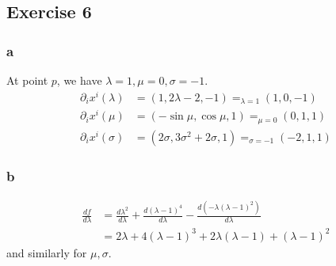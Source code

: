 \subsection{Exercise 6}
\subsubsection{a}
At point $p$, we have $\lambda=1, \mu=0,\sigma=-1$.
\begin{align}
    \partial_i x^i(\lambda) &= (1, 2\lambda-2,-1) =_{\lambda=1} (1,0,-1) \\
    \partial_i x^i(\mu) &= (-\sin{\mu},\cos{\mu}, 1) =_{\mu=0} (0,1,1) \\
    \partial_i x^i(\sigma) &= (2\sigma, 3\sigma^2+2\sigma, 1) =_{\sigma=-1} (-2,1,1)
\end{align}
\subsubsection{b}
\begin{align}
    \frac{df}{d\lambda} &= \frac{d \lambda^2}{d\lambda} + \frac{d(\lambda-1)^4}{d\lambda} - \frac{d(-\lambda(\lambda-1)^2)}{d\lambda} \\
    &= 2\lambda +4(\lambda-1)^3 + 2\lambda (\lambda-1) +(\lambda-1)^2
\end{align}
and similarly for $\mu,\sigma$.
